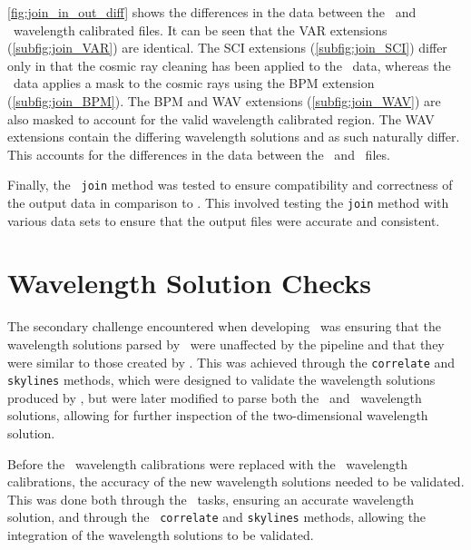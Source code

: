 \autoref{fig:join_in_out_diff} shows the differences in the data between the \polsalt\ and \stops\ wavelength calibrated files. It can be seen that the \gls{VAR} extensions (\autoref{subfig:join_VAR}) are identical. The \gls{SCI} extensions (\autoref{subfig:join_SCI}) differ only in that the cosmic ray cleaning has been applied to the \stops\ data, whereas the \polsalt\ data applies a mask to the cosmic rays using the \gls{BPM} extension (\autoref{subfig:join_BPM}). The \gls{BPM} and \gls{WAV} extensions (\autoref{subfig:join_WAV}) are also masked to account for the valid wavelength calibrated region. The \gls{WAV} extensions contain the differing wavelength solutions and as such naturally differ. This accounts for the differences in the data between the \polsalt\ and \stops\ files.

Finally, the \stops\ \texttt{join} method was tested to ensure compatibility and correctness of the output data in comparison to \polsalt. This involved testing the \texttt{join} method with various data sets to ensure that the output files were accurate and consistent.

\section{Wavelength Solution Checks} \label{sec:test_wav}

The secondary challenge encountered when developing \stops\ was ensuring that the wavelength solutions parsed by \stops\ were unaffected by the pipeline and that they were similar to those created by \polsalt. This was achieved through the \texttt{correlate} and \texttt{skylines} methods, which were designed to validate the wavelength solutions produced by \iraf, but were later modified to parse both the \iraf\ and \polsalt\ wavelength solutions, allowing for further inspection of the two-dimensional wavelength solution.

Before the \polsalt\ wavelength calibrations were replaced with the \iraf\ wavelength calibrations, the accuracy of the new wavelength solutions needed to be validated. This was done both through the \iraf\ tasks, ensuring an accurate wavelength solution, and through the \stops\ \texttt{correlate} and \texttt{skylines} methods, allowing the integration of the wavelength solutions to be validated.



